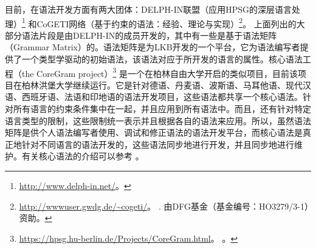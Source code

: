 目前，在语法开发方面有两大团体：DELPH-IN联盟（应用HPSG的深层语言处理）\footnote{%
  \url{http://www.delph-in.net/}。 
} 和CoGETI网络（基于约束的语法：经验、理论与实现）\footnote{%
\url{http://wwwuser.gwdg.de/~cogeti/}。 . 由DFG基金（基金编号：HO3279/3-1）资助。}。
上面列出的大部分语法片段是由DELPH-IN的成员开发的，其中有一些是基于语法矩阵（Grammar Matrix）的。语法矩阵是为LKB开发的一个平台，它为语法编写者提供了一个类型学驱动的初始语法，该语法对应于所开发的语言的属性\citep*{BFO2002a-u}。核心语法工程（the CoreGram project）\footnote{\url{https://hpsg.hu-berlin.de/Projects/CoreGram.html}。 \mytodayc。
}
是一个在柏林自由大学开启的类似项目，目前该项目在柏林洪堡大学继续运行。它是针对德语、丹麦语、波斯语、马耳他语、现代汉语、西班牙语、法语和印地语的语法开发项目，这些语法都共享一个核心语法。针对所有语言的约束条件集中在一起，并且应用到所有语法中。而且，还有针对特定语言类型的限制，这些限制统一表示并且根据各自的语法来应用。所以，虽然语法矩阵是供个人语法编写者使用、调试和修正语法的语法开发平台，而核心语法是真正地针对不同语言的语法开发的，这些语法同步地进行开发，并且同步地进行维护。有关核心语法的介绍可以参考 。


